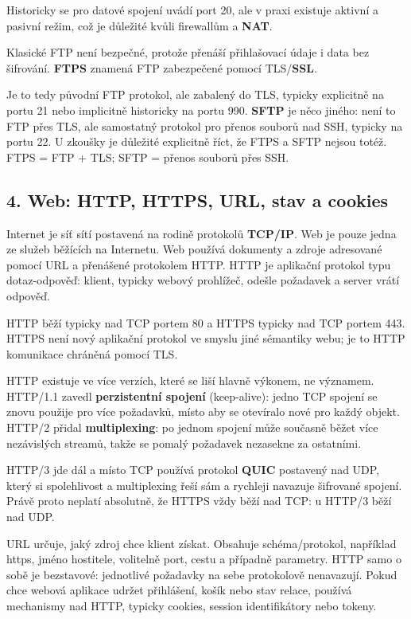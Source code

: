 \documentclass[11pt,a4paper]{article}
\begin{document}
Historicky se pro datové spojení uvádí port 20, ale v praxi existuje aktivní a pasivní režim, což je důležité kvůli firewallům a \textbf{NAT}.

Klasické FTP není bezpečné, protože přenáší přihlašovací údaje i data bez šifrování. \textbf{FTPS} znamená FTP zabezpečené pomocí TLS/\textbf{SSL}.

Je to tedy původní FTP protokol, ale zabalený do TLS, typicky explicitně na portu 21 nebo implicitně historicky na portu 990. \textbf{SFTP} je něco jiného: není to FTP přes TLS, ale samostatný protokol pro přenos souborů nad SSH, typicky na portu 22. U zkoušky je důležité explicitně říct, že FTPS a SFTP nejsou totéž. FTPS = FTP + TLS; SFTP = přenos souborů přes SSH.

\subsection*{4. Web: HTTP, HTTPS, URL, stav a cookies}

Internet je síť sítí postavená na rodině protokolů \textbf{TCP/IP}. Web je pouze jedna ze služeb běžících na Internetu. Web používá dokumenty a zdroje adresované pomocí URL a přenášené protokolem HTTP. HTTP je aplikační protokol typu dotaz-odpověď: klient, typicky webový prohlížeč, odešle požadavek a server vrátí odpověď.

HTTP běží typicky nad TCP portem 80 a HTTPS typicky nad TCP portem 443. HTTPS není nový aplikační protokol ve smyslu jiné sémantiky webu; je to HTTP komunikace chráněná pomocí TLS.

HTTP existuje ve více verzích, které se liší hlavně výkonem, ne významem. HTTP/1.1 zavedl \textbf{perzistentní spojení} (keep-alive): jedno TCP spojení se znovu použije pro více požadavků, místo aby se otevíralo nové pro každý objekt. HTTP/2 přidal \textbf{multiplexing}: po jednom spojení může současně běžet více nezávislých streamů, takže se pomalý požadavek nezasekne za ostatními.

HTTP/3 jde dál a místo TCP používá protokol \textbf{QUIC} postavený nad UDP, který si spolehlivost a multiplexing řeší sám a rychleji navazuje šifrované spojení. Právě proto neplatí absolutně, že HTTPS vždy běží nad TCP: u HTTP/3 běží nad UDP.

URL určuje, jaký zdroj chce klient získat. Obsahuje schéma/protokol, například https, jméno hostitele, volitelně port, cestu a případně parametry. HTTP samo o sobě je bezstavové: jednotlivé požadavky na sebe protokolově nenavazují. Pokud chce webová aplikace udržet přihlášení, košík nebo stav relace, používá mechanismy nad HTTP, typicky cookies, session identifikátory nebo tokeny.
\end{document}
